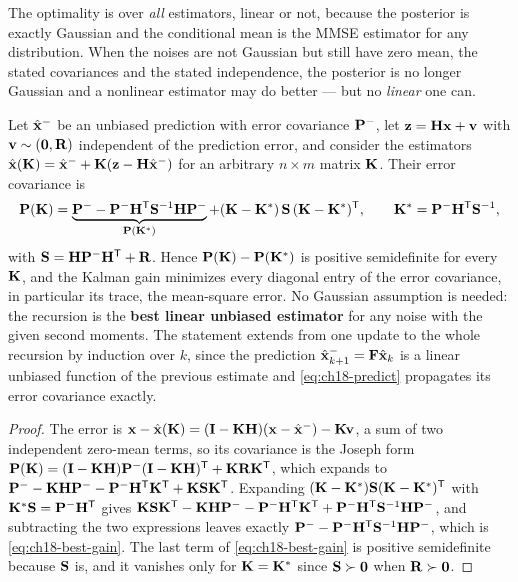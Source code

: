 The optimality is over \emph{all} estimators, linear or not, because the
posterior is exactly Gaussian and the conditional mean is the MMSE estimator
for any distribution. When the noises are not Gaussian but still have zero
mean, the stated covariances and the stated independence, the posterior is no
longer Gaussian and a nonlinear estimator may do better --- but no
\emph{linear} one can.

\begin{proposition}
\label{thm:ch18-best-gain}
Let $\hat{\mathbf{x}}^-$ be an unbiased prediction with error covariance
$\mathbf{P}^-$, let $\mathbf{z}=\mathbf{H}\mathbf{x}+\mathbf{v}$ with
$\mathbf{v}\sim(\mathbf{0},\mathbf{R})$ independent of the prediction error, and
consider the estimators $\hat{\mathbf{x}}(\mathbf{K})=\hat{\mathbf{x}}^-+\mathbf{K}(\mathbf{z}-\mathbf{H}\hat{\mathbf{x}}^-)$
for an arbitrary $n\times m$ matrix $\mathbf{K}$. Their error covariance is
\begin{equation}
  \mathbf{P}(\mathbf{K})=\underbrace{\mathbf{P}^--\mathbf{P}^-\mathbf{H}^{\mathsf{T}}\mathbf{S}^{-1}\mathbf{H}\mathbf{P}^-}_{\mathbf{P}(\mathbf{K}^*)}
  +(\mathbf{K}-\mathbf{K}^*)\,\mathbf{S}\,(\mathbf{K}-\mathbf{K}^*)^{\mathsf{T}},\qquad
  \mathbf{K}^*=\mathbf{P}^-\mathbf{H}^{\mathsf{T}}\mathbf{S}^{-1},
  \label{eq:ch18-best-gain}
\end{equation}
with $\mathbf{S}=\mathbf{H}\mathbf{P}^-\mathbf{H}^{\mathsf{T}}+\mathbf{R}$. Hence $\mathbf{P}(\mathbf{K})-\mathbf{P}(\mathbf{K}^*)$
is positive semidefinite for every $\mathbf{K}$, and the Kalman gain minimizes
every diagonal entry of the error covariance, in particular its trace, the
mean-square error. No Gaussian assumption is needed: the recursion is the
\textbf{best linear unbiased estimator}
for any noise with the given second moments. The statement extends from one
update to the whole recursion by induction over $k$, since the prediction
$\hat{\mathbf{x}}^-_{k+1}=\mathbf{F}\hat{\mathbf{x}}_k$ is a linear unbiased function of
the previous estimate and \cref{eq:ch18-predict} propagates its error
covariance exactly.
\end{proposition}
\begin{proof}
The error is $\mathbf{x}-\hat{\mathbf{x}}(\mathbf{K})=(\mathbf{I}-\mathbf{K}\mathbf{H})(\mathbf{x}-\hat{\mathbf{x}}^-)-\mathbf{K}\mathbf{v}$,
a sum of two independent zero-mean terms, so its covariance is the Joseph
form $\mathbf{P}(\mathbf{K})=(\mathbf{I}-\mathbf{K}\mathbf{H})\mathbf{P}^-(\mathbf{I}-\mathbf{K}\mathbf{H})^{\mathsf{T}}+\mathbf{K}\mathbf{R}\mathbf{K}^{\mathsf{T}}$,
which expands to
$\mathbf{P}^--\mathbf{K}\mathbf{H}\mathbf{P}^--\mathbf{P}^-\mathbf{H}^{\mathsf{T}}\mathbf{K}^{\mathsf{T}}+\mathbf{K}\mathbf{S}\mathbf{K}^{\mathsf{T}}$.
Expanding $(\mathbf{K}-\mathbf{K}^*)\mathbf{S}(\mathbf{K}-\mathbf{K}^*)^{\mathsf{T}}$ with
$\mathbf{K}^*\mathbf{S}=\mathbf{P}^-\mathbf{H}^{\mathsf{T}}$ gives
$\mathbf{K}\mathbf{S}\mathbf{K}^{\mathsf{T}}-\mathbf{K}\mathbf{H}\mathbf{P}^--\mathbf{P}^-\mathbf{H}^{\mathsf{T}}\mathbf{K}^{\mathsf{T}}+\mathbf{P}^-\mathbf{H}^{\mathsf{T}}\mathbf{S}^{-1}\mathbf{H}\mathbf{P}^-$,
and subtracting the two expressions leaves exactly
$\mathbf{P}^--\mathbf{P}^-\mathbf{H}^{\mathsf{T}}\mathbf{S}^{-1}\mathbf{H}\mathbf{P}^-$, which is
\cref{eq:ch18-best-gain}. The last term of \cref{eq:ch18-best-gain} is
positive semidefinite because $\mathbf{S}$ is, and it vanishes only for
$\mathbf{K}=\mathbf{K}^*$ since $\mathbf{S}\succ\mathbf{0}$ when $\mathbf{R}\succ\mathbf{0}$.
\end{proof}

